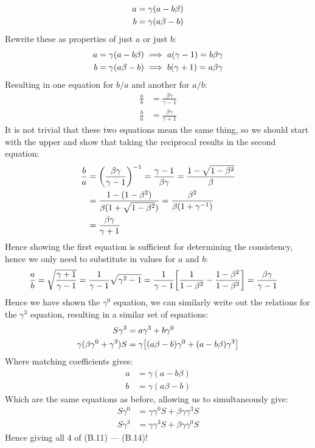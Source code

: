 \documentclass[12pt]{article}
\begin{document}
\begin{align*}
  a&=\gamma\qty(a-b\beta)\\
  b&=\gamma\qty(a\beta-b)
\end{align*}
Rewrite these as properties of just $a$ or just $b$:
\begin{align*}
  a&=\gamma\qty(a-b\beta)\implies a(\gamma-1)=b\beta\gamma\\
  b&=\gamma\qty(a\beta-b)\implies b(\gamma+1)=a\beta\gamma
\end{align*}
Resulting in one equation for $b/a$ and another for $a/b$:
\begin{align*}
  \frac{a}{b}&=\frac{\beta\gamma}{\gamma-1}\\
  \frac{b}{a}&=\frac{\beta\gamma}{\gamma+1}
\end{align*}
It is not trivial that these two equations mean the same thing, so we should start with the upper and show that taking the reciprocal results in the second equation:
\begin{align*}
  \frac{b}{a}&={\qty(\frac{\beta\gamma}{\gamma-1})}^{-1}
  =\frac{\gamma-1}{\beta\gamma}=\frac{1-\sqrt{1-\beta^2}}{\beta}\\
  &=\frac{1-(1-\beta^2)}{\beta(1+\sqrt{1-\beta^2})}=
  \frac{\beta^2}{\beta(1+\gamma^{-1})}\\
  &=\frac{\beta\gamma}{\gamma+1}
\end{align*}
Hence showing the first equation is sufficient for determining the consistency, hence we only need to substitute in values for $a$ and $b$:
\begin{align*}
  \frac{a}{b}&=\sqrt{\frac{\gamma+1}{\gamma-1}}
  =\frac1{\gamma-1}\sqrt{\gamma^2-1}=\frac1{\gamma-1}
  \qty[\frac1{1-\beta^2}-\frac{1-\beta^2}{1-\beta^2}]
  =\frac{\beta\gamma}{\gamma-1}
\end{align*}
Hence we have shown the $\gamma^0$ equation, we can similarly write out the relations for the $\gamma^3$ equation, resulting in a similar set of equations:
\begin{align*}
  S\gamma^3&=a\gamma^3+b\gamma^0\\
  \gamma(\beta\gamma^0+\gamma^3)S&=
  \gamma\qty[(a\beta-b)\gamma^0+(a-b\beta)\gamma^3]
\end{align*}
Where matching coefficients gives:
\begin{align*}
  a&=\gamma(a-b\beta)\\
  b&=\gamma(a\beta-b)
\end{align*}
Which are the same equations as before, allowing us to simultaneously give:
\begin{equation}
  \label{eq:p9b}
  \boxed{
    \begin{aligned}
      S\gamma^0&=\gamma\gamma^0 S+\beta\gamma\gamma^3S\\
      S\gamma^3&=\gamma\gamma^3 S+\beta\gamma\gamma^0S
    \end{aligned}
  }
\end{equation}
Hence giving all 4 of (B.11) --- (B.14)!
\end{document}
